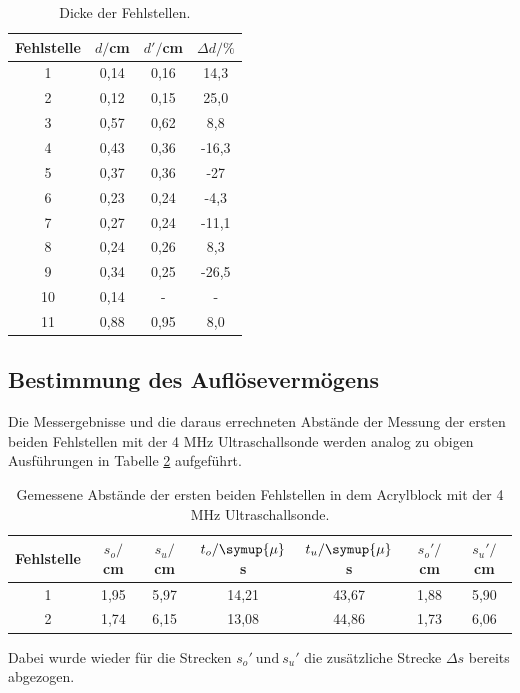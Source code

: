 \begin{table}[H]
  \centering
  \caption{Dicke der Fehlstellen.}
  \label{tab:spannung1}
  \begin{tabular}{c c c c}
    \toprule
  Fehlstelle & $d/$cm & $d'/$cm & $\Delta d/ \%$  \\
    \midrule
    1  &  0,14 & 0,16 & 14,3    \\
    2  &  0,12 & 0,15 & 25,0  \\
    3  &  0,57 & 0,62 & 8,8   \\
    4  &  0,43 & 0,36 & -16,3  \\
    5  &  0,37 & 0,36 & -27   \\
    6  &  0,23 & 0,24 & -4,3   \\
    7  &  0,27 & 0,24 & -11,1   \\
    8  &  0,24 & 0,26 & 8,3   \\
    9  &  0,34 & 0,25 & -26,5   \\
    10 &  0,14 & -    & -    \\
    11 &  0,88 & 0,95 & 8,0   \\
    \bottomrule
  \end{tabular}
\end{table}


\subsection{Bestimmung des Auflösevermögens}
Die Messergebnisse und die daraus errechneten Abstände der Messung der ersten beiden
Fehlstellen mit der 4 MHz Ultraschallsonde werden analog zu obigen Ausführungen in Tabelle \ref{tab:4} aufgeführt.

\begin{table}[H]
  \centering
  \caption{Gemessene Abstände der ersten beiden Fehlstellen in dem Acrylblock mit der 4 MHz Ultraschallsonde.}
  \label{tab:4}
  \begin{tabular}{c c c c c c c}
    \toprule
  Fehlstelle & $s_o/$cm & $s_u/$cm & $t_o/\symup{\mu}$s & $t_u/\symup{\mu}$s & $s_o'/$cm & $s_u'/$cm  \\
    \midrule
    1  &  1,95 & 5,97 & 14,21 & 43,67 & 1,88 & 5,90    \\
    2  &  1,74 & 6,15 & 13,08 & 44,86 & 1,73 & 6,06    \\
    \bottomrule
  \end{tabular}
\end{table}

Dabei wurde wieder für die Strecken $s_o' \: \text{und} \: s_u'$ die zusätzliche Strecke $\Delta s$ bereits abgezogen.

